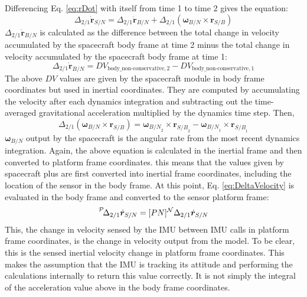Differencing Eq. \ref{eq:rDot} with itself from time 1 to time 2 gives the equation:
\begin{equation}
	\Delta_{2/1} 	\dot{\bm{r}}_{S/N} = \Delta_{2/1} \dot{\bm{r}}_{B/N} + \Delta_{2/1} (\bm{\omega}_{B/N} \times \bm{r}_{S/B})
	\label{eq:DeltaVelocity}
\end{equation}
$\Delta_{2/1} \dot{\bm{r}}_{B/N}$ is calculated as the difference between the total change in velocity accumulated by the spacecraft body frame at time 2 minus the total change in velocity accumulated by the spacecraft body frame at time 1:
\begin{equation}
\Delta_{2/1} \dot{\bm{r}}_{B/N} = DV_{\textrm{body\_non-conservative},2} - DV_{\textrm{body\_non-conservative},1}
\end{equation}
The above $DV$ values are given by the spacecraft module in body frame coordinates but used in inertial coordinates. They are computed by accumulating the velocity after each dynamics integration and subtracting out the time-averaged gravitational acceleration multiplied by the dynamics time step. Then,
\begin{equation}
	\Delta_{2/1} (\bm{\omega}_{B/N} \times \bm{r}_{S/B}) = \bm{\omega}_{{B/N}_2} \times \bm{r}_{{S/B}_2} - \bm{\omega}_{{B/N}_1} \times \bm{r}_{{S/B}_1}
\end{equation}
$\bm{\omega}_{{B/N}}$ output by the spacecraft is the angular rate from the most recent dynamics integration. Again, the above equation is calculated in the inertial frame and then converted to platform frame coordinates. this means that the values given by spacecraft plus are first converted into inertial frame coordinates, including the location of the sensor in the body frame. At this point, Eq. \ref{eq:DeltaVelocity} is evaluated in the body frame and converted to the sensor platform frame:
\begin{equation}
\leftexp{P} {\Delta_{2/1}} 	\dot{\bm{r}}_{S/N} = [PN] ^{\mathcal{N}} \Delta_{2/1} 	\dot{\bm{r}}_{S/N}
\end{equation}
This, the change in velocity sensed by the IMU between IMU calls in platform frame coordinates, is the change in velocity output from the model. To be clear, this is the sensed inertial velocity change in platform frame coordinates. This makes the assumption that the IMU is tracking its attitude and performing the calculations internally to return this value correctly. It is not simply the integral of the acceleration value above in the body frame coordinates.

